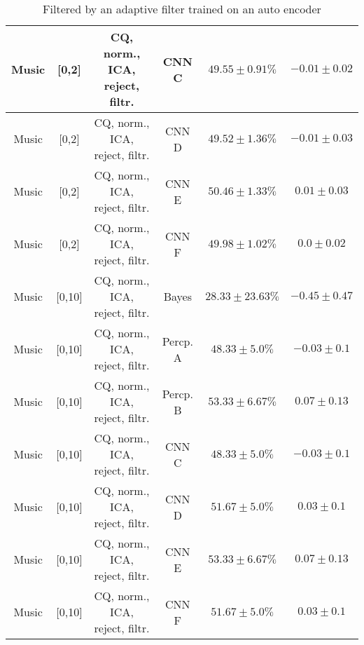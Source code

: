 \begin{table}[!htb]
{\begin{tabular}{c|c|c|c|c|c}
    \hline
    Music               & [0,2]                                         & \scriptsize{CQ, norm., ICA, reject, filtr.}& CNN C                 &  $49.55 \pm 0.91\%$   & $-0.01 \pm 0.02$\\  
    \hline
    Music               & [0,2]                                         & \scriptsize{CQ, norm., ICA, reject, filtr.}& CNN D                 &  $49.52 \pm 1.36\%$   & $-0.01 \pm 0.03$\\ 
    \hline
    Music               & [0,2]                                         & \scriptsize{CQ, norm., ICA, reject, filtr.}& CNN E                 &  $50.46 \pm 1.33\%$   & $0.01 \pm 0.03$\\   
    \hline
    Music               & [0,2]                                         & \scriptsize{CQ, norm., ICA, reject, filtr.}& CNN F                 &  $49.98 \pm 1.02\%$   & $0.0 \pm 0.02$\\ 
    \hline
    Music               & [0,10]                                        & \scriptsize{CQ, norm., ICA, reject, filtr.}& Bayes                 &  $28.33 \pm 23.63\%$  & $-0.45 \pm 0.47$\\  
    \hline
    Music               & [0,10]                                        & \scriptsize{CQ, norm., ICA, reject, filtr.}& Percp. A              &  $48.33 \pm 5.0\%$    & $-0.03 \pm 0.1$\\   
    \hline
    Music               & [0,10]                                        & \scriptsize{CQ, norm., ICA, reject, filtr.}& Percp. B              &  $53.33 \pm 6.67\%$   & $0.07 \pm 0.13$\\   
    \hline
    Music               & [0,10]                                        & \scriptsize{CQ, norm., ICA, reject, filtr.}& CNN C                 &  $48.33 \pm 5.0\%$    & $-0.03 \pm 0.1$\\   
    \hline
    Music               & [0,10]                                        & \scriptsize{CQ, norm., ICA, reject, filtr.}& CNN D                 &  $51.67 \pm 5.0\%$    & $0.03 \pm 0.1$\\    
    \hline
    Music               & [0,10]                                        & \scriptsize{CQ, norm., ICA, reject, filtr.}& CNN E                 &  $53.33 \pm 6.67\%$   & $0.07 \pm 0.13$\\ 
    \hline
    Music               & [0,10]                                        & \scriptsize{CQ, norm., ICA, reject, filtr.}& CNN F                 &  $51.67 \pm 5.0\%$    & $0.03 \pm 0.1$\\  
    \hline
    \end{tabular}
}
\caption{Filtered by an adaptive filter trained on an auto encoder}
\label{tab:sound-filtered+reject-app}
\end{table}